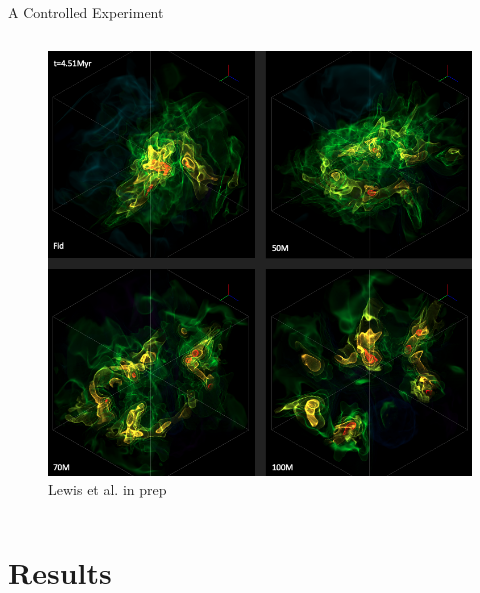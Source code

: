 \documentclass[aspectratio=169]{beamer}
\begin{document}
\begin{frame}{A Controlled Experiment}{}
\begin{columns}
\begin{column}{0.38\textwidth}
            \begin{figure}[h!]
                \centering
                \includegraphics[width=\linewidth]{../images/paper1-snapshot-volume-render.png} \\
		Lewis et al. in prep
                \label{fig:volume}
            \end{figure}
        \end{column}
    \end{columns}
\end{frame} 

\section{Results}
\end{document}
